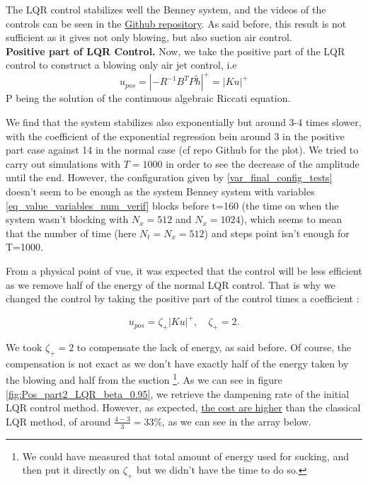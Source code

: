 \documentclass[12pt]{article}
\begin{document}
The LQR control stabilizes well the Benney system, and the videos of the controls can be seen in the 
\href{https://github.com/Bilal59170/Repo_Warwick_internship}{Github repository}. As said before, 
this result is not sufficient as it gives not only blowing, but also suction air control. 
\\


\textbf{Positive part of LQR Control.}
Now, we take the positive part of the LQR control to construct a blowing only air jet control, i.e
\begin{equation}
    u_{pos} = |-R^{-1}B^TP\tilde{h}|^+ = |Ku|^+
\end{equation}
P being the solution of the continuous algebraic Riccati equation.

We find that the system stabilizes also exponentially but around 3-4 times slower, with the coefficient 
of the exponential regression bein around 3 in the positive part case against 14 in the normal case (cf repo Github
for the plot). We tried to carry out simulations with $T = 1000$ in order to see the decrease of the amplitude until the
end. However, the configuration given by \eqref{var_final_config_tests} doesn't seem to be enough as the 
system Benney system with variables \eqref{eq_value_variables_num_verif} blocks before t=160 (the time on when
the system wasn't blocking with $N_x =512$ and $N_x=1024$), which seems to mean that the number of 
time (here $N_t = N_x = 512$) and steps point isn't enough for T=1000. 

From a physical point of vue, it was expected that the control will be less efficient as we remove half 
of the energy of the normal LQR control. That is why we changed the control by taking the positive 
part of the control times a coefficient : 

\begin{equation}
    u_{pos} = \zeta_+|Ku|^+, \quad \zeta_+ = 2.
\end{equation}

We took $\zeta_+ =2$ to compensate the lack of energy, as said before. Of course, the compensation is not exact
as we don't have exactly half of the energy taken by the blowing and half from the suction \footnote{ We could have measured 
that total amount of energy used for sucking, and then put it directly on $\zeta_+$ but we didn't have the time to do
so.}. As we can see in figure \eqref{fig:Pos_part2_LQR_beta_0.95}, we retrieve the dampening rate of the initial LQR control method.
However, as expected, \underline{the cost are higher} than the classical LQR method, of around \underline{$\frac{4-3}{3} = 33\%$}, 
as we can see in the array below. 
\end{document}

